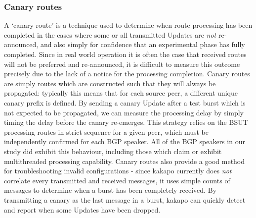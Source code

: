 \subsubsection{\textbf{Canary routes}}
A `canary route' is a technique used to determine when route processing has been completed in the cases where some or all transmitted Updates are {\it not} re-announced, and also simply for confidence that an experimental phase has fully completed.
Since in real world operation it is often the case that received routes will not be preferred and re-announced, it is difficult to measure this outcome precisely due to the lack of a notice for the processing completion.
Canary routes are simply routes which are constructed such that they will always be propagated: typically this means that for each source peer, a different unique canary prefix is defined.
By sending a canary Update after a test burst which is not expected to be propagated, we can measure the processing delay by simply timing the delay before the canary re-emerges.
This strategy relies on the BSUT processing routes in strict sequence for a given peer, which must be independently confirmed for each BGP speaker.
All of the BGP speakers in our study did exhibit this behaviour, including those which claim or exhibit multithreaded processing capability.
Canary routes also provide a good method for troubleshooting invalid configurations - since kakapo currently does {\it not} correlate every transmitted and received messages, it uses simple counts of messages to determine when a burst has been completely received.
By transmitting a canary as the last message in a burst, kakapo can quickly detect and report when some Updates have been dropped.

